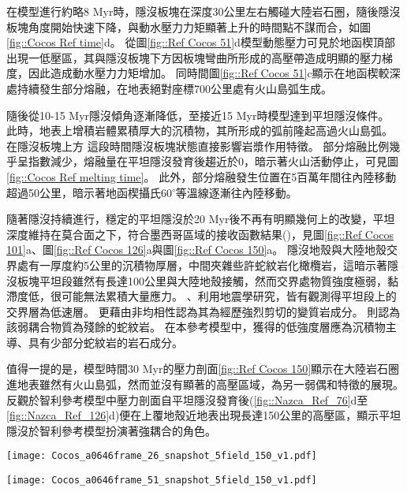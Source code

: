 在模型進行約略8 Myr時，隱沒板塊在深度30公里左右觸碰大陸岩石圈，隨後隱沒板塊角度開始快速下降，與動水壓力力矩顯著上升的時間點不謀而合，如圖\ref{fig::Cocos Ref time}d。
從圖\ref{fig::Ref Cocos 51}d模型動態壓力可見於地函楔頂部出現一低壓區，其與隱沒板塊下方因板塊彎曲所形成的高壓帶造成明顯的壓力梯度，因此造成動水壓力力矩增加。
同時間圖\ref{fig::Ref Cocos 51}c顯示在地函楔較深處持續發生部分熔融，在地表絕對座標700公里處有火山島弧生成。

隨後從10-15 Myr隱沒傾角逐漸降低，至接近15 Myr時模型達到平坦隱沒條件。
此時，地表上增積岩體累積厚大的沉積物，其所形成的弧前隆起高過火山島弧。
在隱沒板塊上方
這段時間隱沒板塊狀態直接影響岩漿作用特徵。
部分熔融比例幾乎呈指數減少，熔融量在平坦隱沒發育後趨近於0，暗示著火山活動停止，可見圖\ref{fig::Cocos Ref melting time}。
此外，部分熔融發生位置在5百萬年間往內陸移動超過50公里，暗示著地函楔攝氏60$^{\circ}$等溫線逐漸往內陸移動。

隨著隱沒持續進行，穩定的平坦隱沒於20 Myr後不再有明顯幾何上的改變，平坦深度維持在莫合面之下，符合墨西哥區域的接收函數結果(\citealp{PerezCampos2008})，見圖\ref{fig::Ref Cocos 101}a、圖\ref{fig::Ref Cocos 126}a與圖\ref{fig::Ref Cocos 150}a。
隱沒地殼與大陸地殼交界處有一厚度約5公里的沉積物厚層，中間夾雜些許蛇紋岩化橄欖岩，這暗示著隱沒板塊平坦段雖然有長達100公里與大陸地殼接觸，然而交界處物質強度極弱，黏滯度低，很可能無法累積大量應力。
\citealp{Song2009}、\citealp{Song2012SC}利用地震學研究，皆有觀測得平坦段上的交界層為低速層。
\citealp{Song2012SC}更藉由非均相性認為其為經歷強烈剪切的變質岩成分。
\citealp{Manea2017}則認為該弱耦合物質為殘餘的蛇紋岩。
在本參考模型中，獲得的低強度層應為沉積物主導、具有少部分蛇紋岩的岩石成分。

值得一提的是，模型時間30 Myr的壓力剖面\ref{fig::Ref Cocos 150}顯示在大陸岩石圈進地表雖然有火山島弧，然而並沒有顯著的高壓區域，為另一弱偶和特徵的展現。
反觀於智利參考模型中壓力剖面自平坦隱沒發育後(\ref{fig::Nazca_Ref_76}d至\ref{fig::Nazca_Ref_126}d)便在上覆地殼近地表出現長達150公里的高壓區，顯示平坦隱沒於智利參考模型扮演著強耦合的角色。



\begin{figure*}[htp]
    \centering
    \texttt{[image: Cocos\_a0646frame\_26\_snapshot\_5field\_150\_v1.pdf]}
    \caption[墨西哥參考模型於5 Myr時之結果]{墨西哥參考模型於5 Myr時之結果。}
    \label{fig::Ref Cocos 26}
\end{figure*}

\begin{figure*}[htp]
    \centering
    \texttt{[image: Cocos\_a0646frame\_51\_snapshot\_5field\_150\_v1.pdf]}
    \caption[墨西哥參考模型於10 Myr時之結果]{墨西哥參考模型於10 Myr時之結果。}
    \label{fig::Ref Cocos 51}
\end{figure*}


